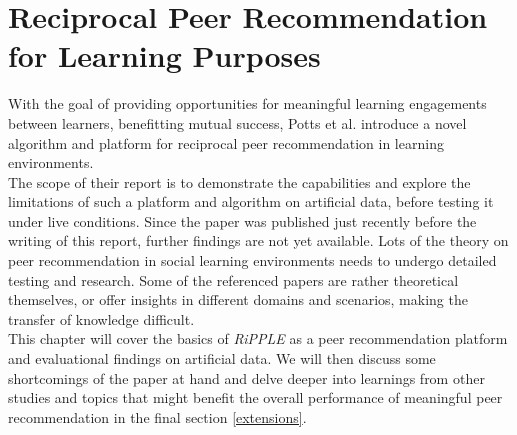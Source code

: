 \documentclass[conference]{IEEEtran}
\begin{document}
\section{Reciprocal Peer Recommendation for Learning Purposes} \label{paper} \label{paper:introduction}
With the goal of providing opportunities for meaningful learning engagements between learners, benefitting mutual success, Potts et al. introduce a novel algorithm and platform for reciprocal peer recommendation in learning environments. \cite{potts2018reciprocal}\\
The scope of their report is to demonstrate the capabilities and explore the limitations of such a platform and algorithm on artificial data, before testing it under live conditions. Since the paper was published just recently before the writing of this report, further findings are not yet available. Lots of the theory on peer recommendation in social learning environments needs to undergo detailed testing and research. Some of the referenced papers are rather theoretical themselves, or offer insights in different domains and scenarios, making the transfer of knowledge difficult.\\
This chapter will cover the basics of \textit{RiPPLE} as a peer recommendation platform and evaluational findings on artificial data. We will then discuss some shortcomings of the paper at hand and delve deeper into learnings from other studies and topics that might benefit the overall performance of meaningful peer recommendation in the final section \ref{extensions}.\\
\end{document}
